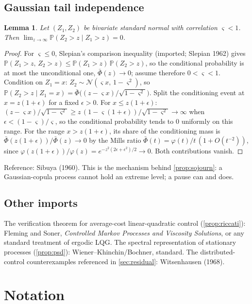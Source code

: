 \documentclass[11pt, a4paper]{article}
\theoremstyle{definition}
\theoremstyle{plain}
\newtheorem{lemma}[theorem]{Lemma}
\theoremstyle{remark}
\newcommand{\Prob}{\mathbb{P}}
\begin{document}
\subsection{Gaussian tail independence}\label{sec:app-tail-independence}
\begin{lemma}\label{lem:tail-independence}
Let $(Z_1, Z_2)$ be bivariate standard normal with correlation
$\varsigma < 1$.  Then
$\lim_{z\to\infty} \Prob(Z_2 > z \mid Z_1 > z) = 0$.
\end{lemma}
\begin{proof}
For $\varsigma \le 0$, Slepian's comparison inequality (imported;
Slepian 1962) gives
$\Prob(Z_1 > z,\, Z_2 > z) \le \Prob(Z_1>z)\,\Prob(Z_2>z)$, so the
conditional probability is at most the unconditional one,
$\bar\Phi(z) \to 0$; assume therefore $0 < \varsigma < 1$.
Condition on $Z_1 = x$:
$Z_2 \sim \mathcal N(\varsigma x,\, 1-\varsigma^2)$, so
$\Prob(Z_2 > z \mid Z_1 = x)
= \bar\Phi\bigl((z-\varsigma x)/\sqrt{1-\varsigma^2}\bigr)$.
Split the conditioning event at $x = z(1+\epsilon)$ for a fixed
$\epsilon > 0$.  For $x \le z(1+\epsilon)$:
$(z - \varsigma x)/\sqrt{1-\varsigma^2}
\ge z\,(1 - \varsigma(1+\epsilon))/\sqrt{1-\varsigma^2} \to \infty$
when $\epsilon < (1-\varsigma)/\varsigma$, so the conditional
probability tends
to $0$ uniformly on this range.  For the range $x > z(1+\epsilon)$,
its share of the conditioning mass is
$\bar\Phi(z(1+\epsilon))/\bar\Phi(z) \to 0$ by the Mills ratio
$\bar\Phi(t) = \varphi(t)/t\,(1+O(t^{-2}))$, since
$\varphi(z(1+\epsilon))/\varphi(z) = e^{-z^2(2\epsilon+\epsilon^2)/2}
\to 0$.  Both contributions vanish.
\end{proof}
Reference: Sibuya (1960).  This is the mechanism behind
\cref{prop:sojourn}: a Gaussian-copula process cannot hold an extreme
level; a pause can and does.

\subsection{Other imports}\label{sec:app-other}
The verification theorem for average-cost linear-quadratic control
(\cref{prop:riccati}): Fleming and Soner, \emph{Controlled Markov
Processes and Viscosity Solutions}, or any standard treatment of ergodic
LQG.  The spectral representation of stationary processes
(\cref{prop:psd}): Wiener--Khinchin/Bochner, standard.  The
distributed-control counterexamples referenced in \cref{sec:residual}:
Witsenhausen (1968).

\section{Notation}\label{sec:notation}
\end{document}
